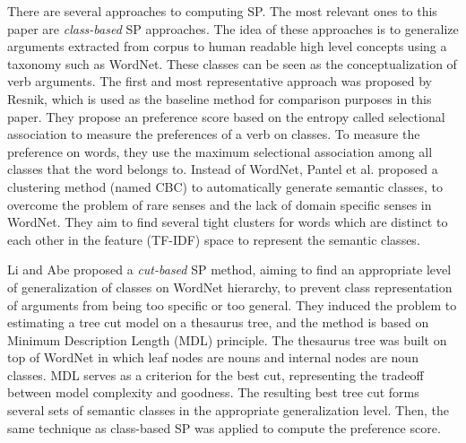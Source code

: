 There are several approaches to computing SP.
The most relevant ones to this paper are {\em class-based} SP approaches.
The idea of these approaches is to
generalize arguments extracted from corpus to human readable
high level concepts using a taxonomy such as WordNet\cite{wordnet}.
These classes can be seen as the conceptualization of verb arguments.
The first and most representative approach was proposed
by Resnik\cite{resnik1996selectional},
which is used as the baseline method for comparison purposes in this
paper.
They propose an preference score based on the entropy
called selectional association to measure the preferences
of a verb on classes. To measure the preference on words,
they use the maximum selectional association among
all classes that the word belongs to.
Instead of WordNet,
Pantel et al.\cite{pantel2003clustering}
proposed a clustering method (named CBC) to
automatically generate semantic classes,
to overcome the problem of rare senses and the
lack of domain specific senses in WordNet.
They aim to find several tight clusters for words
which are distinct to each other in the feature (TF-IDF)
space to represent the semantic classes.

Li and Abe\cite{li1998generalizing} proposed a {\em cut-based} SP method,
aiming to find an appropriate level of generalization of classes
on WordNet hierarchy, to prevent class representation of arguments
from being too specific or too general. They induced the problem to
estimating a tree cut model on a thesaurus tree, and the method is
based on Minimum Description Length (MDL) principle.
The thesaurus tree was built on top of WordNet in which leaf nodes are
nouns and internal nodes are noun classes.
MDL serves as a criterion for the best cut, representing the
tradeoff between model complexity and goodness.
The resulting best tree cut forms several sets of semantic classes
in the appropriate generalization level. Then, the same technique as
class-based SP was applied to compute the preference score.

